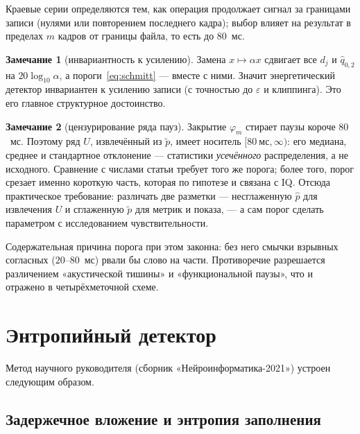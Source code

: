 \documentclass[11pt,a4paper]{article}
\theoremstyle{definition}
\newtheorem{zam}{Замечание}[section]
\theoremstyle{plain}
\begin{document}
Краевые серии определяются тем, как операция продолжает сигнал за границами
записи (нулями или повторением последнего кадра); выбор влияет на результат в
пределах $m$ кадров от границы файла, то есть до $80$~мс.

\begin{zam}[инвариантность к усилению]\label{zam:gain}
Замена $x\mapsto\alpha x$ сдвигает все $d_j$ и $\hat q_{0{,}2}$ на
$20\log_{10}\alpha$, а пороги~\eqref{eq:schmitt} --- вместе с ними. Значит
энергетический детектор инвариантен к усилению записи (с точностью до
$\varepsilon$ и клиппинга). Это его главное структурное достоинство.
\end{zam}

\begin{zam}[цензурирование ряда пауз]\label{zam:censor}
Закрытие $\varphi_m$ стирает паузы короче $80$~мс. Поэтому ряд $U$, извлечённый
из $\tilde p$, имеет носитель $[80\ \text{мс},\infty)$: его медиана, среднее и
стандартное отклонение --- статистики \emph{усечённого} распределения, а не
исходного. Сравнение с числами статьи требует того же порога; более того,
порог срезает именно короткую часть, которая по гипотезе и связана с IQ.
Отсюда практическое требование: различать две разметки --- несглаженную $\hat p$
для извлечения $U$ и сглаженную $\tilde p$ для метрик и показа, --- а сам порог
сделать параметром с исследованием чувствительности.
\end{zam}

Содержательная причина порога при этом законна: без него смычки взрывных
согласных ($20$--$80$~мс) рвали бы слово на части. Противоречие разрешается
различением «акустической тишины» и «функциональной паузы», что и отражено в
четырёхметочной схеме.

\section{Энтропийный детектор}

Метод научного руководителя (сборник «Нейроинформатика-2021») устроен
следующим образом.

\subsection{Задержечное вложение и энтропия заполнения}
\end{document}
